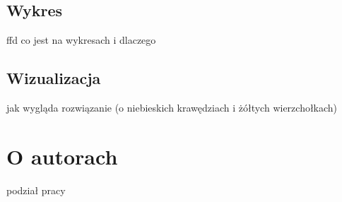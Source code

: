 \documentclass[11pt]{aghdpl}
\begin{document}
\section{Wykres}
\label{sec:chart}
ffd
co jest na wykresach i dlaczego
\section{Wizualizacja}
\label{sec:visualization}
jak wygląda rozwiązanie (o niebieskich krawędziach i żółtych wierzchołkach)

\chapter{O autorach} 
\label{cha:aboutAut}
podział pracy


%
%



% 
% 

%
%
%
%
%
%
\end{document}
